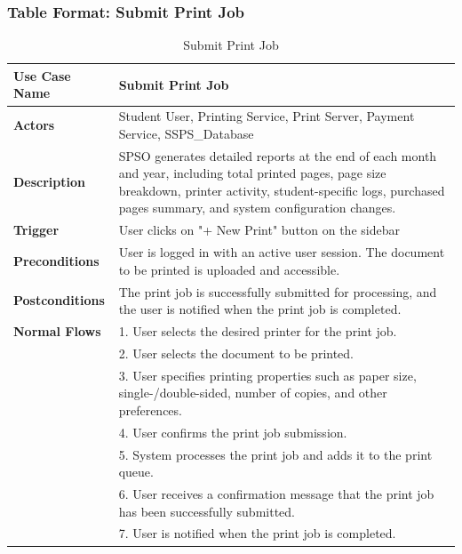 \subsubsection{Table Format: Submit Print Job}

\begin{table}[H]
\begin{tabular}{|p{5cm}|p{9cm}|}
\hline
\textbf{Use Case Name} & Submit Print Job \\
\hline
\textbf{Actors} & Student User, Printing Service, Print Server, Payment Service, SSPS\_Database \\
\hline
\textbf{Description} & SPSO generates detailed reports at the end of each month and year, including total printed pages, page size breakdown, printer activity, student-specific logs, purchased pages summary, and system configuration changes. \\
\hline
\textbf{Trigger} & User clicks on "+ New Print" button on the sidebar  \\
\hline
\textbf{Preconditions} & User is logged in with an active user session. The document to be printed is uploaded and accessible. \\
\hline
\textbf{Postconditions} & The print job is successfully submitted for processing, and the user is notified when the print job is completed. \\
\hline
\textbf{Normal Flows} & 
1. User selects the desired printer for the print job. \\
&2. User selects the document to be printed. \\
&3. User specifies printing properties such as paper size, single-/double-sided, number of copies, and other preferences. \\
&4. User confirms the print job submission. \\
&5. System processes the print job and adds it to the print queue. \\
&6. User receives a confirmation message that the print job has been successfully submitted. \\
&7. User is notified when the print job is completed. \\
\hline
\end{tabular}
\caption{Submit Print Job}
\end{table}

